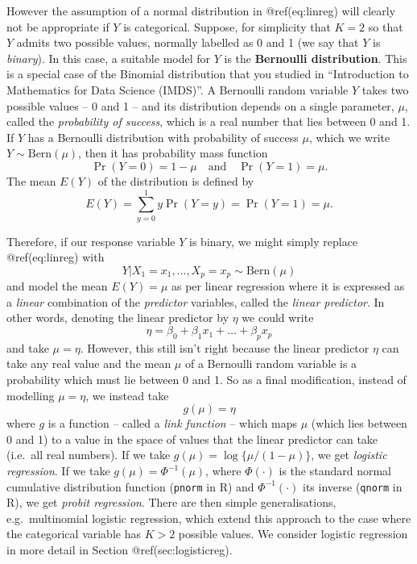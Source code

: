 \documentclass[
]{article}
\begin{document}
However the assumption of a normal distribution in @ref(eq:linreg) will
clearly not be appropriate if \(Y\) is categorical. Suppose, for
simplicity that \(K=2\) so that \(Y\) admits two possible values,
normally labelled as 0 and 1 (we say that \(Y\) is \emph{binary}). In
this case, a suitable model for \(Y\) is the \textbf{Bernoulli
distribution}. This is a special case of the Binomial distribution that
you studied in ``Introduction to Mathematics for Data Science (IMDS)''.
A Bernoulli random variable \(Y\) takes two possible values -- 0 and 1
-- and its distribution depends on a single parameter, \(\mu\), called
the \emph{probability of success}, which is a real number that lies
between 0 and 1. If \(Y\) has a Bernoulli distribution with probability
of success \(\mu\), which we write \(Y \sim \mathrm{Bern}(\mu)\), then
it has probability mass function \begin{equation*}
\Pr(Y = 0) = 1 - \mu \quad \text{and} \quad \Pr(Y = 1) = \mu.
\end{equation*} The mean \(E(Y)\) of the distribution is defined by
\begin{equation*}
E(Y) = \sum_{y=0}^1 y \Pr(Y = y) = \Pr(Y = 1) = \mu.
\end{equation*}

Therefore, if our response variable \(Y\) is binary, we might simply
replace @ref(eq:linreg) with \begin{equation*}
Y | X_1 = x_1, \ldots, X_p = x_p \sim \mathrm{Bern}(\mu)
\end{equation*} and model the mean \(E(Y)=\mu\) as per linear regression
where it is expressed as a \emph{linear} combination of the
\emph{predictor} variables, called the \emph{linear predictor}. In other
words, denoting the linear predictor by \(\eta\) we could write
\begin{equation*}
\eta = \beta_0 + \beta_1 x_{1} + \ldots + \beta_p x_{p}
\end{equation*} and take \(\mu = \eta\). However, this still isn't right
because the linear predictor \(\eta\) can take any real value and the
mean \(\mu\) of a Bernoulli random variable is a probability which must
lie between 0 and 1. So as a final modification, instead of modelling
\(\mu = \eta\), we instead take \begin{equation*}
g(\mu) = \eta
\end{equation*} where \(g\) is a function -- called a \emph{link
function} -- which maps \(\mu\) (which lies between 0 and 1) to a value
in the space of values that the linear predictor can take (i.e.~all real
numbers). If we take \(g(\mu) = \log \{ \mu / (1 - \mu) \}\), we get
\emph{logistic regression}. If we take \(g(\mu) = \Phi^{-1}(\mu)\),
where \(\Phi(\cdot)\) is the standard normal cumulative distribution
function (\texttt{pnorm} in R) and \(\Phi^{-1}(\cdot)\) its inverse
(\texttt{qnorm} in R), we get \emph{probit regression}. There are then
simple generalisations, e.g.~multinomial logistic regression, which
extend this approach to the case where the categorical variable has
\(K>2\) possible values. We consider logistic regression in more detail
in Section @ref(sec:logisticreg).
\end{document}
